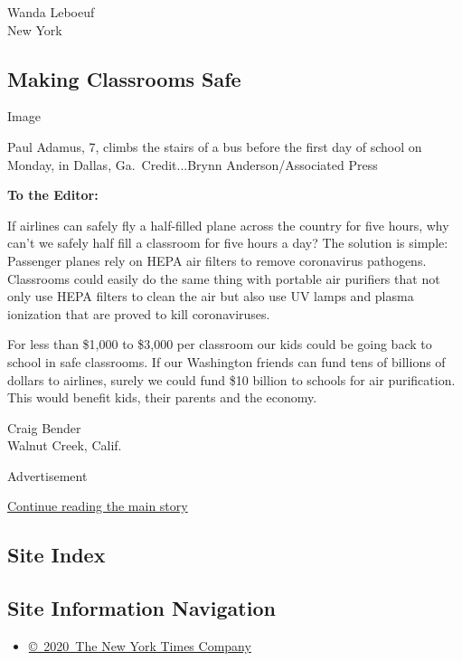 Wanda Leboeuf\\
New York

\hypertarget{making-classrooms-safe}{%
\subsection{Making Classrooms Safe}\label{making-classrooms-safe}}

Image

Paul Adamus, 7, climbs the stairs of a bus before the first day of
school on Monday, in Dallas, Ga.~Credit...Brynn Anderson/Associated
Press

\textbf{To the Editor:}

If airlines can safely fly a half-filled plane across the country for
five hours, why can't we safely half fill a classroom for five hours a
day? The solution is simple: Passenger planes rely on HEPA air filters
to remove coronavirus pathogens. Classrooms could easily do the same
thing with portable air purifiers that not only use HEPA filters to
clean the air but also use UV lamps and plasma ionization that are
proved to kill coronaviruses.

For less than \$1,000 to \$3,000 per classroom our kids could be going
back to school in safe classrooms. If our Washington friends can fund
tens of billions of dollars to airlines, surely we could fund \$10
billion to schools for air purification. This would benefit kids, their
parents and the economy.

Craig Bender\\
Walnut Creek, Calif.

Advertisement

\protect\hyperlink{after-bottom}{Continue reading the main story}

\hypertarget{site-index}{%
\subsection{Site Index}\label{site-index}}

\hypertarget{site-information-navigation}{%
\subsection{Site Information
Navigation}\label{site-information-navigation}}

\begin{itemize}
\tightlist
\item
  \href{https://help.nytimes.com/hc/en-us/articles/115014792127-Copyright-notice}{©~2020~The
  New York Times Company}
\end{itemize}

